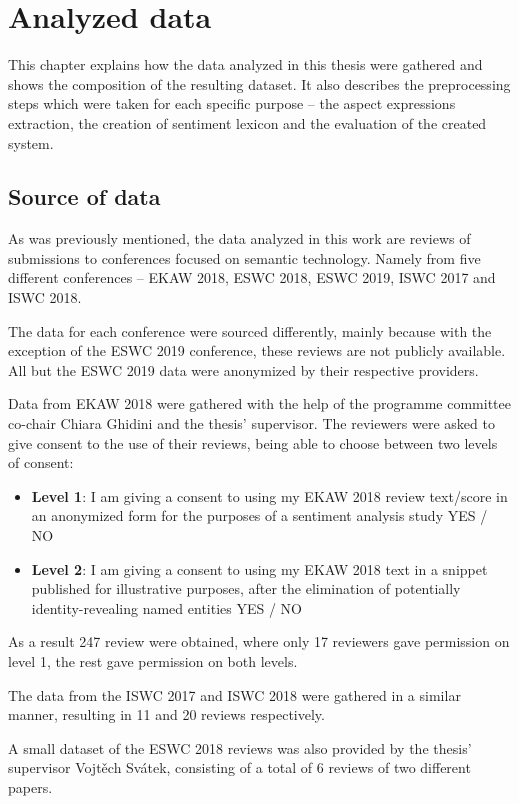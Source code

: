 \chapter{Analyzed data}
This chapter explains how the data analyzed in this thesis were gathered and shows the composition of the resulting dataset. It also describes the preprocessing steps which were taken for each specific purpose -- the aspect expressions extraction, the creation of sentiment lexicon and the evaluation of the created system.
\section{Source of data}
As was previously mentioned, the data analyzed in this work are reviews of submissions to conferences focused on semantic technology. Namely from five different conferences --  EKAW 2018, ESWC 2018, ESWC 2019, ISWC 2017 and ISWC 2018.

The data for each conference were sourced differently, mainly because with the exception of the ESWC 2019 conference, these reviews are not publicly available. All but the ESWC 2019 data were anonymized by their respective providers.

Data from EKAW 2018 were gathered with the help of the programme committee co-chair Chiara Ghidini and the thesis' supervisor. The reviewers were asked to give consent to the use of their reviews, being able to choose between two levels of consent:
\begin{itemize}
\item \textbf{Level 1}: I am giving a consent to using my EKAW 2018 review text/score in an anonymized form for the purposes of a sentiment analysis study      YES / NO
\item \textbf{Level 2}: I am giving a consent to using my EKAW 2018 text in a snippet published for illustrative purposes, after the elimination of potentially identity-revealing named entities      YES / NO
\end{itemize}

As a result  247 review were obtained, where only 17 reviewers gave permission on level 1, the rest gave permission on both levels.

The data from the ISWC 2017 and ISWC 2018 were gathered in a similar manner, resulting in 11 and 20 reviews respectively.

A small dataset of the ESWC 2018 reviews was also provided by the thesis' supervisor Vojtěch Svátek, consisting of a total of 6 reviews of two different papers.

